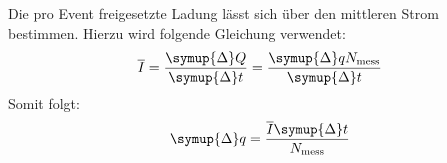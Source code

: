 Die pro Event freigesetzte Ladung lässt sich über den mittleren Strom bestimmen.
Hierzu wird folgende Gleichung verwendet:
\begin{equation}
    \overline{I} = \frac{\symup{\Delta}Q}{\symup{\Delta}t} = \frac{\symup{\Delta}q N_\text{mess}}{\symup{\Delta}t}
\end{equation}
Somit folgt:
\begin{equation}
    \label{eqn:ladung}
    \symup{\Delta}q = \frac{\overline{I} \symup{\Delta} t}{N_\text{mess}}
\end{equation}
